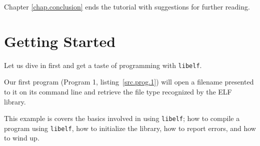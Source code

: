 \documentclass[a4paper]{report}
\newcommand{\library}[1]{\texttt{#1}}
\begin{document}
Chapter \vref{chap.conclusion} ends the tutorial with suggestions for
further reading.

\chapter{Getting Started}\label{chap.getting-started}

Let us dive in first and get a taste of programming with
\library{libelf}.

Our first program (Program 1, listing~\vref{src.prog.1}) will open a
filename presented to it on its command line and retrieve the file
type recognized by the ELF library.

This example is covers the basics involved in using \library{libelf};
how to compile a program using \library{libelf}, how to initialize the
library, how to report errors, and how to wind up.
\end{document}
